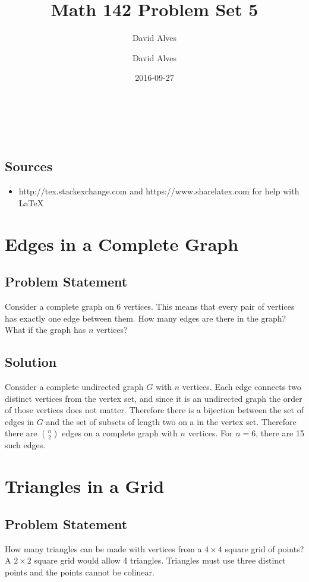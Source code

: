 \documentclass[12pt]{article}
\author{David Alves}
\title{Math 142 Problem Set 5}
\author{David Alves}
\date{2016-09-27}
\begin{document}

\begin{center}
\Large \thetitle \\
\large \theauthor \\
\thedate
\end{center}

\subsection*{Sources}

    \begin{itemize}
    \item http://tex.stackexchange.com and https://www.sharelatex.com for help with \LaTeX
    \end{itemize}

\section{Edges in a Complete Graph }

\subsection*{Problem Statement}
Consider a complete graph on 6 vertices. This means that every pair of vertices has exactly one edge between them. How many edges are there in the graph? What if the graph has $n$ vertices?
\subsection*{Solution}

Consider a complete undirected graph $G$ with $n$ vertices. Each edge connects two distinct vertices from the vertex set, and since it is an undirected graph the order of those vertices does not matter. Therefore there is a bijection between the set of edges in $G$ and the set of subsets of length two on a in the vertex set. Therefore there are $\binom{n}{2}$ edges on a complete graph with $n$ vertices. For $n=6$, there are 15 such edges.

\section{Triangles in a Grid}
\subsection*{Problem Statement}
How many triangles can be made with vertices from a $4\times4$ square grid of points? A $2\times2$ square grid would allow 4 triangles. Triangles must use three distinct points and the points cannot be colinear.
\end{document}
